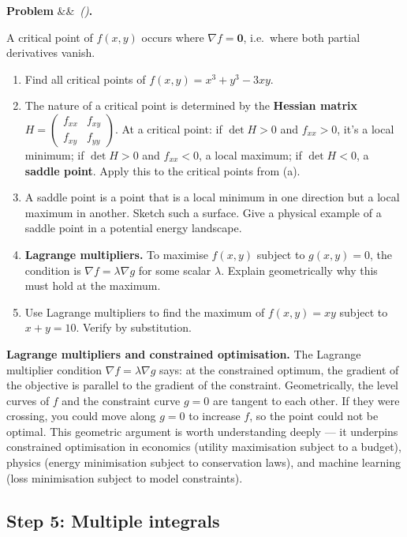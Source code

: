 \documentclass[12pt, a4paper]{article}
\newcounter{problem}
\newenvironment{problem}[1][]{%
  \refstepcounter{problem}%
  \par\vspace{6pt}%
  \noindent\textbf{\color{MidBlue}Problem \theproblem}%
  \ifx&#1&\else\ \textit{(#1)}\fi\textbf{.}\enskip
}{\par\vspace{4pt}}
\begin{document}
\begin{problem}
\label{prob:multi_optim}
A critical point of $f(x,y)$ occurs where $\nabla f = \mathbf{0}$, i.e.\ where both partial derivatives vanish.
\begin{enumerate}[label=(\alph*), topsep=2pt]
  \item Find all critical points of $f(x,y) = x^3 + y^3 - 3xy$.
  \item The nature of a critical point is determined by the \textbf{Hessian matrix} $H = \begin{pmatrix} f_{xx} & f_{xy} \\ f_{xy} & f_{yy} \end{pmatrix}$. At a critical point: if $\det H > 0$ and $f_{xx} > 0$, it's a local minimum; if $\det H > 0$ and $f_{xx} < 0$, a local maximum; if $\det H < 0$, a \textbf{saddle point}. Apply this to the critical points from (a).
  \item A saddle point is a point that is a local minimum in one direction but a local maximum in another. Sketch such a surface. Give a physical example of a saddle point in a potential energy landscape.
  \item \textbf{Lagrange multipliers.} To maximise $f(x,y)$ subject to $g(x,y) = 0$, the condition is $\nabla f = \lambda \nabla g$ for some scalar $\lambda$. Explain geometrically why this must hold at the maximum.
  \item Use Lagrange multipliers to find the maximum of $f(x,y) = xy$ subject to $x + y = 10$. Verify by substitution.
\end{enumerate}
\end{problem}

\begin{thought}
\textbf{Lagrange multipliers and constrained optimisation.}
The Lagrange multiplier condition $\nabla f = \lambda \nabla g$ says: at the constrained optimum, the gradient of the objective is parallel to the gradient of the constraint. Geometrically, the level curves of $f$ and the constraint curve $g = 0$ are tangent to each other. If they were crossing, you could move along $g = 0$ to increase $f$, so the point could not be optimal. This geometric argument is worth understanding deeply --- it underpins constrained optimisation in economics (utility maximisation subject to a budget), physics (energy minimisation subject to conservation laws), and machine learning (loss minimisation subject to model constraints).
\end{thought}

\subsection{Step 5: Multiple integrals}
\end{document}
